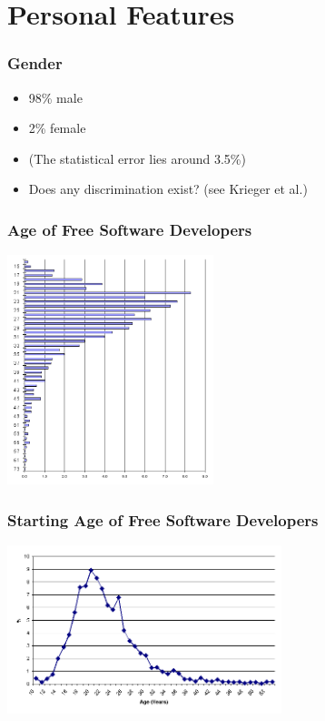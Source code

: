 \documentclass{beamer}
\begin{document}
\section{Personal Features}

\begin{frame}
\frametitle{Gender}

\begin{itemize}
\item 98\% male
\item 2\% female
\item (The statistical error lies around 3.5\%)
\item Does any discrimination exist? (see Krieger et al.)
\end{itemize}

\end{frame}

\begin{frame}
\frametitle{Age of Free Software Developers}

\begin{center}
\includegraphics[width=6cm]{figs/age.png}
\end{center}

\end{frame}


\begin{frame}
\frametitle{Starting Age of Free Software Developers}

\begin{center}
\includegraphics[width=8cm]{figs/starting-age.png}
\end{center}

\end{frame}
\end{document}
